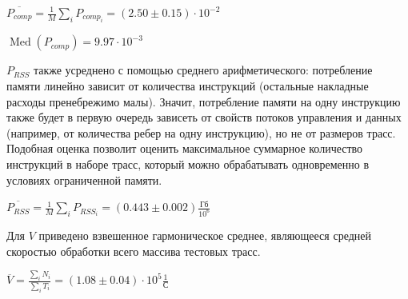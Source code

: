 $\displaystyle \overline{P_{comp}} = \frac{1}{M} \sum_{i} P_{comp_i} = \left( 2.50 \pm 0.15 \right) \cdot 10^{-2} $

\vspace{0.3cm}

$ \displaystyle \operatorname{Med}\left( P_{comp} \right) = 9.97 \cdot 10^{-3} $

\vspace{0.3cm}

$P_{RSS}$ также усреднено с помощью среднего арифметического: потребление памяти линейно зависит от количества инструкций (остальные накладные расходы пренебрежимо малы). Значит, потребление памяти на одну инструкцию также будет в первую очередь зависеть от свойств потоков управления и данных (например, от количества ребер на одну инструкцию), но не от размеров трасс. Подобная оценка позволит оценить максимальное суммарное количество инструкций в наборе трасс, который можно обрабатывать одновременно в условиях ограниченной памяти.

\vspace{0.3cm}

$\displaystyle \overline{P_{RSS}} = \frac{1}{M} \sum_{i} P_{RSS_i} = \left( 0.443 \pm 0.002 \right) \frac{\texttt{Гб}}{10^6} $

\vspace{0.3cm}

Для $V$ приведено взвешенное гармоническое среднее, являющееся средней скоростью обработки всего массива тестовых трасс.

\vspace{0.3cm}

$\displaystyle \overline{V} = \frac{\displaystyle \sum_{i} N_i}{\displaystyle \sum_{i} T_i} = \left( 1.08 \pm 0.04 \right) \cdot 10^{5} \frac{1}{\texttt{С}}$
